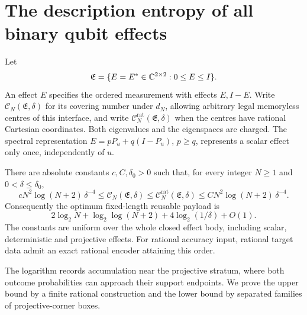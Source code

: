 \section{The description entropy of all binary qubit effects}\label{sec:biasedentropy75}
Let
\[
 \mathfrak E=\{E=E^*\in\mathbb C^{2\times2}:0\le E\le I\}.
\]
An effect $E$ specifies the ordered measurement with effects $E,I-E$.
Write $\mathcal C_N(\mathfrak E,\delta)$ for its covering number under
$d_N$, allowing arbitrary legal memoryless centres of this interface,
and write $\mathcal C_N^{\mathrm{rat}}(\mathfrak E,\delta)$ when the
centres have rational Cartesian coordinates. Both eigenvalues and the
eigenspaces are charged. The spectral representation
$E=pP_u+q(I-P_u)$, $p\ge q$, represents a scalar effect only once,
independently of $u$.

\begin{theorem}\label{thm:biasedcover75}
There are absolute constants $c,C,\delta_0>0$ such that, for every integer
$N\ge1$ and $0<\delta\le\delta_0$,
\begin{equation}\label{eq:biasedcover75}
 cN^2\log(N+2)\,\delta^{-4}
 \le \mathcal C_N(\mathfrak E,\delta)
 \le \mathcal C_N^{\mathrm{rat}}(\mathfrak E,\delta)
 \le CN^2\log(N+2)\,\delta^{-4}.
\end{equation}
Consequently the optimum fixed-length reusable payload is
\begin{equation}\label{eq:biasedbits75}
 2\log_2N+\log_2\log(N+2)+4\log_2(1/\delta)+O(1).
\end{equation}
The constants are uniform over the whole closed effect body, including
scalar, deterministic and projective effects. For rational accuracy
input, rational target data admit an exact rational encoder attaining
this order.
\end{theorem}
The logarithm records accumulation near the projective stratum, where
both outcome probabilities can approach their support endpoints.
We prove the upper bound by a finite rational construction and the
lower bound by separated families of projective-corner boxes.

